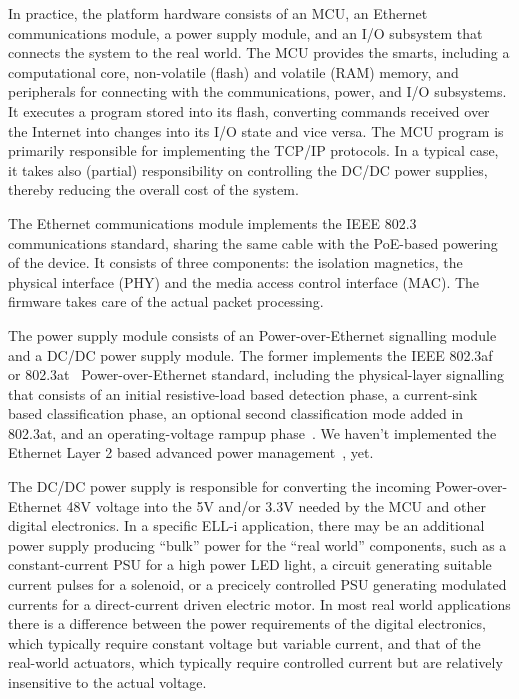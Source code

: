 \documentclass[draft,a4paper]{siamltex}
\begin{document}
In practice, the platform hardware consists of an MCU, an Ethernet
communications module, a power supply module, and an I/O subsystem
that connects the system to the real world.  The MCU provides the
smarts, including a computational core, non-volatile (flash) and
volatile (RAM) memory, and peripherals for connecting with the
communications, power, and I/O subsystems.  It executes a program
stored into its flash, converting commands received over the Internet
into changes into its I/O state and vice versa.  The MCU program is
primarily responsible for implementing the TCP/IP protocols.  In a
typical case, it takes also (partial) responsibility on controlling
the DC/DC power supplies, thereby reducing the overall cost of the
system.

The Ethernet communications module implements the IEEE 802.3~\cite{802.3}
communications standard, sharing the same cable with the PoE-based
powering of the device.  It consists of three components: the
isolation magnetics, the physical interface (PHY) and the media access
control interface (MAC).  The firmware takes care of the actual packet
processing.

The power supply module consists of an Power-over-Ethernet signalling
module and a DC/DC power supply module.  The former implements the
IEEE 802.3af~\cite{802.3af} or 802.3at~\cite{802.3at}
Power-over-Ethernet standard, including the physical-layer signalling
that consists of an initial resistive-load based detection phase, a
current-sink based classification phase, an optional second
classification mode added in 802.3at, and an operating-voltage rampup
phase~\cite{802.3at}.  We haven't implemented the Ethernet Layer 2
based advanced power management~\cite{802.3at}, yet.

The DC/DC power supply is responsible for converting the incoming
Power-over-Ethernet 48V voltage into the 5V and/or 3.3V needed by the
MCU and other digital electronics.  In a specific ELL-i application,
there may be an additional power supply producing ``bulk'' power for
the ``real world'' components, such as a constant-current PSU for a
high power LED light, a circuit generating suitable current pulses for
a solenoid, or a precicely controlled PSU generating modulated
currents for a direct-current driven electric motor.  In most real
world applications there is a difference between the power
requirements of the digital electronics, which typically require
constant voltage but variable current, and that of the real-world
actuators, which typically require controlled current but are
relatively insensitive to the actual voltage.
\end{document}
